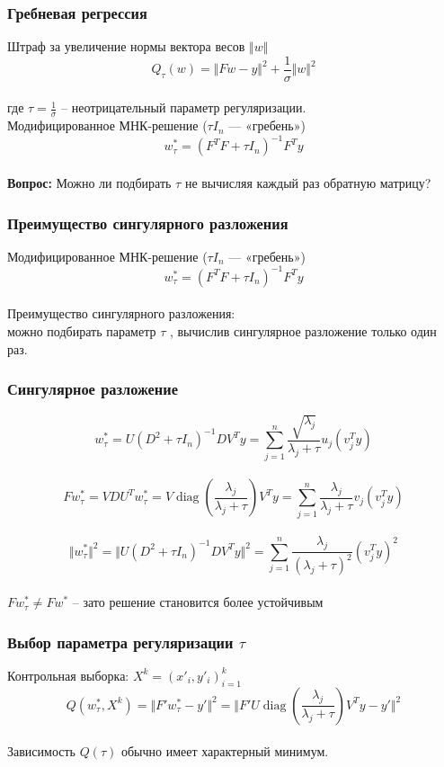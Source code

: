 \documentclass[10pt]{beamer}
\begin{document}
\begin{frame}\frametitle{Гребневая регрессия}
	Штраф за увеличение нормы вектора весов $\Vert w \Vert$\\
	$$Q_{\tau} (w) = \Vert F w - y \Vert^2 + \frac{1}{\sigma} \Vert w \Vert^2$$\\
	где $\tau = \frac{1}{\sigma}$ -- неотрицательный параметр регуляризации.\\
	\bigbreak
	Модифицированное МНК-решение ($\tau I_n$ — «гребень»)\\
	$$w^*_{\tau} = (F^TF + \tau I_n)^{-1}F^Ty$$\\
	
	\textbf{Вопрос:} Можно ли подбирать $\tau$ не вычисляя каждый раз обратную матрицу?
\end{frame}

\begin{frame}\frametitle{Преимущество сингулярного разложения}
	Модифицированное МНК-решение ($\tau I_n$ — «гребень»)\\
	$$w^*_{\tau} = (F^TF + \tau I_n)^{-1}F^Ty$$\\
	Преимущество сингулярного разложения:\\
	можно подбирать параметр $\tau$ , вычислив сингулярное разложение только один раз.
\end{frame}

\begin{frame}\frametitle{Сингулярное разложение}
	$$w_{\tau}^*= U(D^2 + \tau I_n)^{-1}DV^Ty = \sum\limits_{j=1}^n \frac{\sqrt{\lambda_j}}{\lambda_j + \tau} u_j(v_j^Ty)$$\\
	$$Fw_{\tau}^* = VDU^Tw_{\tau}^* = V \operatorname{diag} \left(\frac{\lambda_j}{\lambda_j + \tau}\right) V^Ty = \sum\limits_{j=1}^n \frac{\lambda_j}{\lambda_j + \tau} v_j (v_j^Ty)$$\\
	$$\Vert w_{\tau}^* \Vert^2 = \Vert U(D^2 + \tau I_n)^{-1} DV^T y \Vert^2 = \sum\limits_{j=1}^n \frac{\lambda_j}{(\lambda_j + \tau)^2} (v^T_j y)^2$$\\
	$F w_{\tau}^* \neq Fw^*$ -- зато решение становится более устойчивым
\end{frame}

\begin{frame}\frametitle{Выбор параметра регуляризации $\tau$}
	Контрольная выборка: $X^k = (x'_i, y'_i)_{i=1}^k$\\
	$$Q(w_{\tau}^*,X^k) = \Vert F' w_{\tau}^* - y' \Vert^2 = \Vert F'U \operatorname{diag} \left(\frac{\lambda_j}{\lambda_j + \tau}\right) V^T y -y' \Vert^2$$\\
	Зависимость $Q(\tau)$ обычно имеет характерный минимум.
\end{frame}
\end{document}
